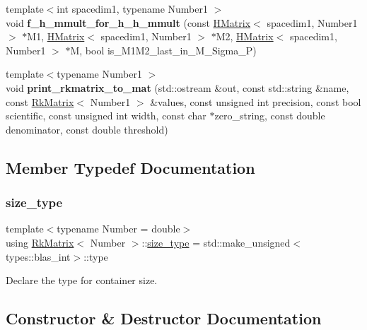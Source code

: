 \begin{DoxyCompactItemize}
\item 
\mbox{\label{classRkMatrix_a311938523b49a053a8cf16bc96576cdf}} 
{\footnotesize template$<$int spacedim1, typename Number1 $>$ }\\void {\bfseries f\+\_\+h\+\_\+mmult\+\_\+for\+\_\+h\+\_\+h\+\_\+mmult} (const \hyperlink{classHMatrix}{H\+Matrix}$<$ spacedim1, Number1 $>$ $\ast$M1, \hyperlink{classHMatrix}{H\+Matrix}$<$ spacedim1, Number1 $>$ $\ast$M2, \hyperlink{classHMatrix}{H\+Matrix}$<$ spacedim1, Number1 $>$ $\ast$M, bool is\+\_\+\+M1\+M2\+\_\+last\+\_\+in\+\_\+\+M\+\_\+\+Sigma\+\_\+P)
\item 
\mbox{\label{classRkMatrix_a13b3be6d580847d1907db18253e37f05}} 
{\footnotesize template$<$typename Number1 $>$ }\\void {\bfseries print\+\_\+rkmatrix\+\_\+to\+\_\+mat} (std\+::ostream \&out, const std\+::string \&name, const \hyperlink{classRkMatrix}{Rk\+Matrix}$<$ Number1 $>$ \&values, const unsigned int precision, const bool scientific, const unsigned int width, const char $\ast$zero\+\_\+string, const double denominator, const double threshold)
\end{DoxyCompactItemize}


\subsection{Member Typedef Documentation}
\mbox{\label{classRkMatrix_add060bfc3a4cc77f858c3d6dd58cadd5}} 
\subsubsection{\texorpdfstring{size\+\_\+type}{size\_type}}
{\footnotesize\ttfamily template$<$typename Number = double$>$ \\
using \hyperlink{classRkMatrix}{Rk\+Matrix}$<$ Number $>$\+::\hyperlink{classRkMatrix_add060bfc3a4cc77f858c3d6dd58cadd5}{size\+\_\+type} =  std\+::make\+\_\+unsigned$<$types\+::blas\+\_\+int$>$\+::type}

Declare the type for container size. 

\subsection{Constructor \& Destructor Documentation}
\mbox{\label{classRkMatrix_aa2753ce8e37595824ac275e6b26255cf}} 
